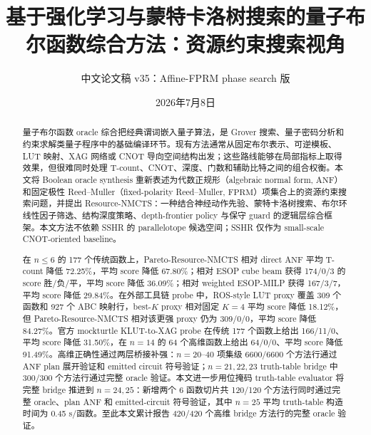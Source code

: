 \documentclass[UTF8,fontset=macnew,11pt]{ctexart}
\title{基于强化学习与蒙特卡洛树搜索的量子布尔函数综合方法：资源约束搜索视角}
\author{中文论文稿 v35：Affine-FPRM phase search 版}
\date{2026年7月8日}
\newcommand{\method}{Resource-NMCTS}
\newcommand{\anf}{\ensuremath{\mathrm{ANF}}}
\newcommand{\fprm}{\ensuremath{\mathrm{FPRM}}}
\begin{document}
\pagestyle{plain}
\maketitle

\begin{abstract}
量子布尔函数 oracle 综合把经典谓词嵌入量子算法，是 Grover 搜索、量子密码分析和约束求解类量子程序中的基础编译环节。现有方法通常从固定布尔表示、可逆模板、LUT 映射、XAG 网络或 CNOT 导向空间结构出发；这些路线能够在局部指标上取得效果，但很难同时处理 T-count、CNOT、深度、门数和辅助比特之间的组合权衡。本文将 Boolean oracle synthesis 重新表述为代数正规形（algebraic normal form, \anf{}）和固定极性 Reed--Muller（fixed-polarity Reed--Muller, \fprm{}）项集合上的资源约束搜索问题，并提出 \method{}：一种结合神经动作先验、蒙特卡洛树搜索、布尔环线性因子筛选、结构深度策略、depth-frontier policy 与保守 guard 的逻辑层综合框架。本文方法不依赖 SSHR 的 parallelotope 候选空间；SSHR 仅作为 small-scale CNOT-oriented baseline。

在 $n\leq6$ 的 177 个传统函数上，Pareto-\method{} 相对 direct \anf{} 平均 T-count 降低 72.25\%，平均 score 降低 67.80\%；相对 ESOP cube beam 获得 174/0/3 的 score 胜/负/平，平均 score 降低 36.09\%；相对 weighted ESOP-MILP 获得 167/3/7，平均 score 降低 29.84\%。在外部工具链 probe 中，ROS-style LUT proxy 覆盖 309 个函数和 927 个 ABC 映射行，best-$K$ proxy 相对固定 $K=4$ 平均 score 降低 18.12\%，但 Pareto-\method{} 相对该更强 proxy 仍为 309/0/0，平均 score 降低 84.27\%。官方 mockturtle KLUT-to-XAG probe 在传统 177 个函数上给出 166/11/0、平均 score 降低 31.50\%，在 $n=14$ 的 64 个高维函数上给出 64/0/0、平均 score 降低 91.49\%。高维正确性通过两层桥接补强：$n=20$--$40$ 项集级 6600/6600 个方法行通过 \anf{} plan 展开验证和 emitted circuit 符号验证；$n=21,22,23$ truth-table bridge 中 300/300 个方法行通过完整 oracle 验证。本文进一步用位掩码 truth-table evaluator 将完整 bridge 推进到 $n=24,25$：新增两个 6 函数切片共 120/120 个方法行同时通过完整 oracle、plan \anf{} 和 emitted-circuit 符号验证，其中 $n=25$ 平均 truth-table 构造时间为 0.45 s/函数。至此本文累计报告 420/420 个高维 bridge 方法行的完整 oracle 验证。


\end{abstract}
\end{document}
